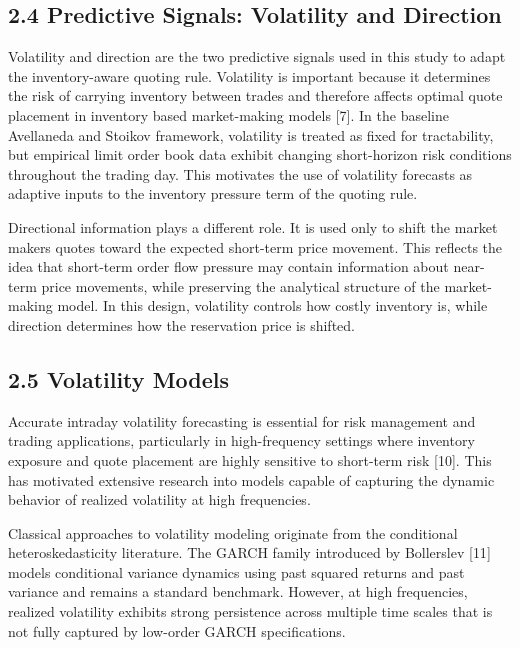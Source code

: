 \documentclass[12pt,a4paper]{article}
\begin{document}
\subsection{2.4 Predictive Signals: Volatility and
Direction}\label{predictive-signals-volatility-and-direction}

Volatility and direction are the two predictive signals used in this
study to adapt the inventory-aware quoting rule. Volatility is important
because it determines the risk of carrying inventory between trades and
therefore affects optimal quote placement in inventory based
market-making models {[}7{]}. In the baseline Avellaneda and Stoikov
framework, volatility is treated as fixed for tractability, but
empirical limit order book data exhibit changing short-horizon risk
conditions throughout the trading day. This motivates the use of
volatility forecasts as adaptive inputs to the inventory pressure term
of the quoting rule.

Directional information plays a different role. It is used only to shift
the market maker\textquotesingle s quotes toward the expected short-term
price movement. This reflects the idea that short-term order flow
pressure may contain information about near-term price movements, while
preserving the analytical structure of the market-making model. In this
design, volatility controls how costly inventory is, while direction
determines how the reservation price is shifted.

\subsection{2.5 Volatility Models}\label{volatility-models}

Accurate intraday volatility forecasting is essential for risk
management and trading applications, particularly in high-frequency
settings where inventory exposure and quote placement are highly
sensitive to short-term risk {[}10{]}. This has motivated extensive
research into models capable of capturing the dynamic behavior of
realized volatility at high frequencies.

Classical approaches to volatility modeling originate from the
conditional heteroskedasticity literature. The GARCH family introduced
by Bollerslev {[}11{]} models conditional variance dynamics using past
squared returns and past variance and remains a standard benchmark.
However, at high frequencies, realized volatility exhibits strong
persistence across multiple time scales that is not fully captured by
low-order GARCH specifications.
\end{document}
